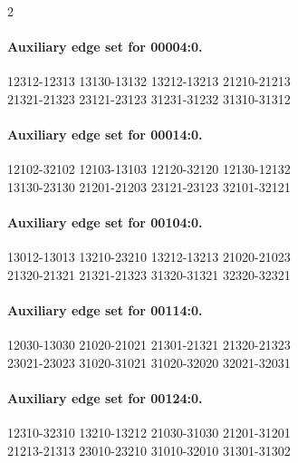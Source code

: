 \begin{multicols}{2}
\paragraph{Auxiliary edge set for 00004:0.}
\begingroup\footnotesize\ttfamily\begin{flushleft}
12312-12313 13130-13132 13212-13213 21210-21213\\
21321-21323 23121-23123 31231-31232 31310-31312\\
\end{flushleft}\endgroup
\paragraph{Auxiliary edge set for 00014:0.}
\begingroup\footnotesize\ttfamily\begin{flushleft}
12102-32102 12103-13103 12120-32120 12130-12132\\
13130-23130 21201-21203 23121-23123 32101-32121\\
\end{flushleft}\endgroup
\paragraph{Auxiliary edge set for 00104:0.}
\begingroup\footnotesize\ttfamily\begin{flushleft}
13012-13013 13210-23210 13212-13213 21020-21023\\
21320-21321 21321-21323 31320-31321 32320-32321\\
\end{flushleft}\endgroup
\paragraph{Auxiliary edge set for 00114:0.}
\begingroup\footnotesize\ttfamily\begin{flushleft}
12030-13030 21020-21021 21301-21321 21320-21323\\
23021-23023 31020-31021 31020-32020 32021-32031\\
\end{flushleft}\endgroup
\paragraph{Auxiliary edge set for 00124:0.}
\begingroup\footnotesize\ttfamily\begin{flushleft}
12310-32310 13210-13212 21030-31030 21201-31201\\
21213-21313 23010-23210 31010-32010 31301-31302\\
\end{flushleft}\endgroup

\end{multicols}
